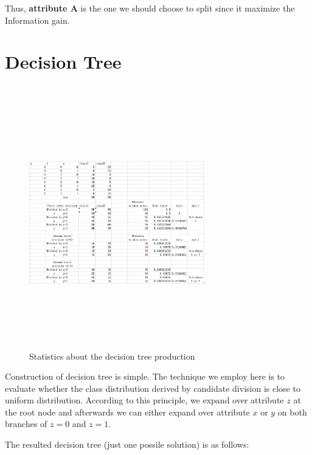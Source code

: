 \documentclass[11pt,a4paper]{article}
\begin{document}
 Thus, \textbf{attribute A} is the one we should choose to split since it maximize the
Information gain.

\newpage

\section{Decision Tree}
\\
\begin{figure}[h]
    \centering
    \includegraphics[width=3in,height=4in]{./section3.png} \\
    \caption{Statistics about the decision tree production}
\end{figure}

Construction of decision tree is simple. The technique we employ here is to
evaluate whether the class distribution derived by candidate division is close
to uniform distribution. According to this principle, we expand over attribute
$z$ at the root node and afterwards we can either expand over attribute $x$ or
$y$ on both branches of $z=0$ and $z=1$.  

The resulted decision tree (just one possile solution) is as follows:
\end{document}
